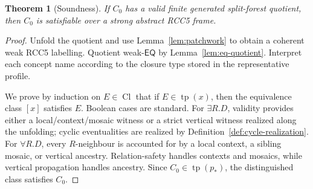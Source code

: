 \documentclass[11pt]{article}
\newtheorem{theorem}[definition]{Theorem}
\theoremstyle{remark}
\newcommand{\EQ}{\mathsf{EQ}}
\newcommand{\Cl}{\operatorname{Cl}}
\newcommand{\tp}{\operatorname{tp}}
\begin{document}
\begin{theorem}[Soundness]\label{thm:soundness}
If $C_0$ has a valid finite generated split-forest quotient, then $C_0$ is satisfiable over a strong abstract RCC5 frame.
\end{theorem}
\begin{proof}
Unfold the quotient and use Lemma~\ref{lem:patchwork} to obtain a coherent weak RCC5 labelling.  Quotient weak-$\EQ$ by Lemma~\ref{lem:eq-quotient}.  Interpret each concept name according to the closure type stored in the representative profile.

We prove by induction on $E\in\Cl$ that if $E\in\tp(x)$, then the equivalence class $[x]$ satisfies $E$.  Boolean cases are standard.  For $\exists R.D$, validity provides either a local/context/mosaic witness or a strict vertical witness realized along the unfolding; cyclic eventualities are realized by Definition~\ref{def:cycle-realization}.  For $\forall R.D$, every $R$-neighbour is accounted for by a local context, a sibling mosaic, or vertical ancestry.  Relation-safety handles contexts and mosaics, while vertical propagation handles ancestry.  Since $C_0\in\tp(p_*)$, the distinguished class satisfies $C_0$.
\end{proof}
\end{document}
